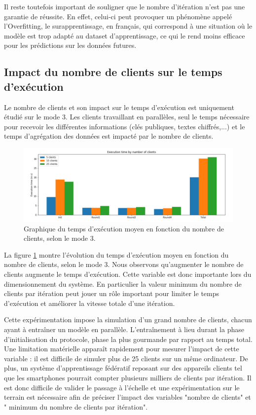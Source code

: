 \documentclass{article}
\begin{document}
Il reste toutefois important de souligner que le nombre d'itération n'est pas une garantie de réussite. En effet, celui-ci peut provoquer un phénomène appelé l'Overfitting, le surapprentissage, en français, qui correspond à une situation où le modèle est trop adapté au dataset d'apprentissage, ce qui le rend moins efficace pour les prédictions sur les données futures.

\subsection{Impact du nombre de clients sur le temps d'exécution}
Le nombre de clients et son impact sur le temps d'exécution est uniquement étudié sur le mode 3. Les clients travaillant en parallèles, seul le temps nécessaire pour recevoir les différentes informations (clés publiques, textes chiffrés,...) et le temps d'agrégation des données est impacté par le nombre de clients.

    \begin{figure}[H]
    \centerline{\includegraphics[width=14cm]{img/graph_time_per_clients.png}}
  \caption{Graphique du temps d'exécution moyen en fonction du nombre de clients, selon le mode 3.}
  \label{fig:graph_clients}
\end{figure}

La figure \ref{fig:graph_clients} montre l'évolution du temps d'exécution moyen en fonction du nombre de clients, selon le mode 3. Nous observons qu'augmenter le nombre de clients augmente le temps d'exécution. Cette variable est donc importante lors du dimensionnement du système. En particulier la valeur minimum du nombre de clients par itération peut jouer un rôle important pour limiter le temps d'exécution et améliorer la vitesse totale d'une itération.

Cette expérimentation impose la simulation d'un grand nombre de clients, chacun ayant à entraîner un modèle en parallèle. L'entraînement à lieu durant la phase d'initialisation du protocole, phase la plus gourmande par rapport au temps total. Une limitation matérielle apparaît rapidement pour mesurer l'impact de cette variable : il est difficile de simuler plus de 25 clients sur un même ordinateur. De plus, un système d'apprentissage fédératif reposant sur des appareils clients tel que les smartphones pourrait compter plusieurs milliers de clients par itération. Il est donc difficile de valider le passage à l'échelle et une expérimentation sur le terrain est nécessaire afin de préciser l'impact des variables "nombre de clients" et " minimum du nombre de clients par itération".
\end{document}
